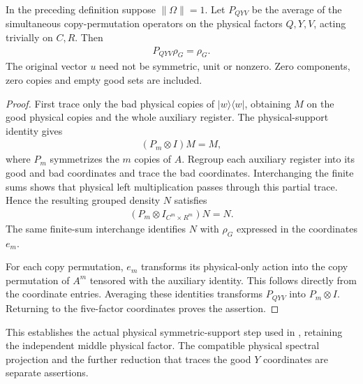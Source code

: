 \begin{theorem}
\label{thm:replica_good_configuration_support}
\leanok
{}
In the preceding definition suppose $\|\Omega\|=1$. Let $P_{QYV}$ be the
average of the simultaneous copy-permutation operators on the physical
factors $Q,Y,V$, acting trivially on $C,R$. Then
\begin{align}
 P_{QYV}\rho_G=\rho_G.
\end{align}
The original vector $u$ need not be symmetric, unit or nonzero. Zero
components, zero copies and empty good sets are included.
\end{theorem}
\begin{proof}
\leanok
First trace only the bad physical copies of $|w\rangle\langle w|$,
obtaining $M$ on the good physical copies and the whole auxiliary register.
The physical-support identity gives
\begin{align}
 (P_m\otimes I)M=M,
\end{align}
where $P_m$ symmetrizes the $m$ copies of $A$.
Regroup each auxiliary register into its good and bad coordinates and
trace the bad coordinates. Interchanging the finite sums shows that
physical left multiplication passes through this partial trace. Hence the
resulting grouped density $N$ satisfies
\begin{align}
 (P_m\otimes I_{C^m\times R^m})N=N.
\end{align}
The same finite-sum interchange identifies $N$ with $\rho_G$ expressed in
the coordinates $e_m$.

For each copy permutation, $e_m$ transforms its physical-only action into
the copy permutation of $A^m$ tensored with the auxiliary identity. This
follows directly from the coordinate entries. Averaging these identities
transforms $P_{QYV}$ into $P_m\otimes I$. Returning to the five-factor
coordinates proves the assertion.
\end{proof}

This establishes the actual physical symmetric-support step used in
\cite[Section~7]{OpenAI2026AreaLaw}, retaining the independent middle
physical factor. The compatible physical spectral projection and the
further reduction that traces the good $Y$ coordinates are separate
assertions.
